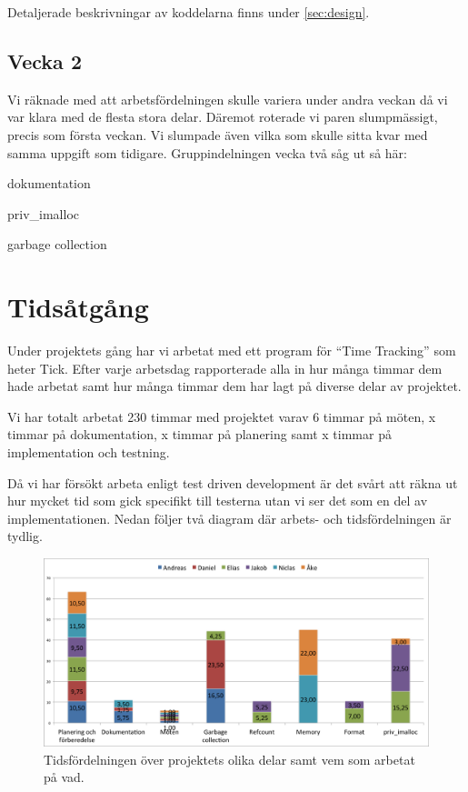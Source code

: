 \documentclass{article}
\begin{document}
Detaljerade beskrivningar av koddelarna finns under \ref{sec:design}.

\subsection{Vecka 2}
Vi räknade med att arbetsfördelningen skulle variera under andra veckan då vi var klara med de flesta stora delar. Däremot roterade vi paren slumpmässigt, precis som första veckan. Vi slumpade även vilka som skulle sitta kvar med samma uppgift som tidigare. Gruppindelningen vecka två såg ut så här:

\begin{description} \parskip0pt
  \item[Andreas och Niclas] dokumentation
  \item[Jakob och Åke] priv\_imalloc
  \item[Daniel och Elias] garbage collection
\end{description}

\section{Tidsåtgång}

Under projektets gång har vi arbetat med ett program för “Time Tracking” som heter Tick. Efter varje arbetsdag rapporterade alla in hur många timmar dem hade arbetat samt hur många timmar dem har lagt på diverse delar av projektet.

Vi har totalt arbetat 230 timmar med projektet varav 6 timmar på möten, x timmar på dokumentation, x timmar på planering samt x timmar på implementation och testning.

Då vi har försökt arbeta enligt test driven development är det svårt att räkna ut hur mycket tid som gick specifikt till testerna utan vi ser det som en del av implementationen. Nedan följer två diagram där arbets- och tidsfördelningen är tydlig.

\begin{figure}[H]
  \includegraphics[width=\columnwidth]{../bilder/chart_parts.png}
  \caption{Tidsfördelningen över projektets olika delar 
    samt vem som arbetat på vad.}
  \label{fig:chart_parts}
\end{figure}
\end{document}
